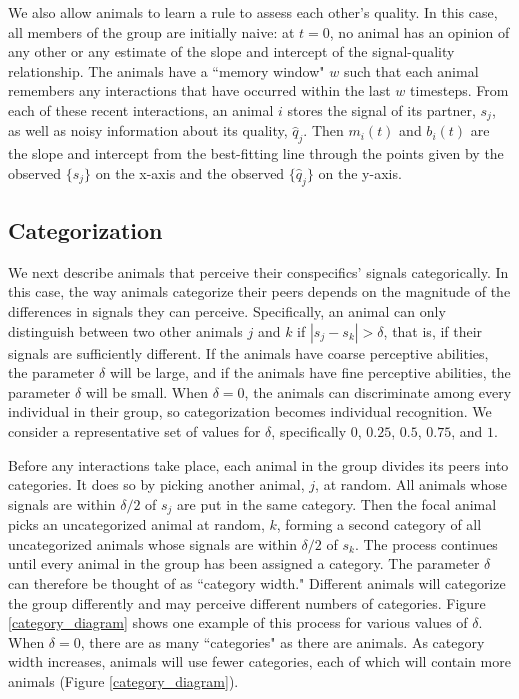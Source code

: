 We also allow animals to learn a rule to assess each other's quality. In this case, all members of the group are initially naive: at $t=0$, no animal has an opinion of any other or any estimate of the slope and intercept of the signal-quality relationship. The animals have a ``memory window" $w$ such that each animal remembers any interactions that have occurred within the last $w$ timesteps. From each of these recent interactions, an animal $i$ stores the signal of its partner, $s_j$, as well as noisy information about its quality, $\hat{q}_j$.  Then $m_i(t)$ and $b_i(t)$ are the slope and intercept from the best-fitting line through the points given by the observed $\{s_j\}$ on the x-axis and the observed $\{\hat{q}_j\}$ on the y-axis.   

\subsection*{Categorization}
We next describe animals that perceive their conspecifics' signals categorically. In this case, the way animals categorize their peers depends on the magnitude of the differences in signals they can perceive. Specifically, an animal can only distinguish between two other animals $j$ and $k$ if $|s_j-s_k|>\delta$, that is, if their signals are sufficiently different. If the animals have coarse perceptive abilities, the parameter $\delta$ will be large, and if the animals have fine perceptive abilities, the parameter $\delta$ will be small. When $\delta=0$, the animals can discriminate among every individual in their group, so categorization becomes individual recognition. We consider a representative set of values for $\delta$, specifically $0$, $0.25$, $0.5$, $0.75$, and $1$.

Before any interactions take place, each animal in the group divides its peers into categories. It does so by picking another animal, $j$, at random. All animals whose signals are within $\delta/2$ of $s_j$ are put in the same category. Then the focal animal picks an uncategorized animal at random, $k$, forming a second category of all uncategorized animals whose signals are within $\delta/2$ of $s_k$. The process continues until every animal in the group has been assigned a category. The parameter $\delta$ can therefore be thought of as ``category width."  Different animals will categorize the group differently and may perceive different numbers of categories. Figure \ref{category_diagram} shows one example of this process for various values of $\delta$. When $\delta=0$, there are as many ``categories" as there are animals. As category width increases, animals will use fewer categories, each of which will contain more animals  (Figure \ref{category_diagram}). 

